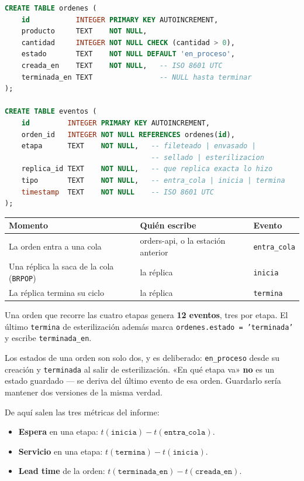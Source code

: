 \documentclass[12pt,a4paper]{article}
\begin{document}
\begin{lstlisting}[language=SQL]
CREATE TABLE ordenes (
    id           INTEGER PRIMARY KEY AUTOINCREMENT,
    producto     TEXT    NOT NULL,
    cantidad     INTEGER NOT NULL CHECK (cantidad > 0),
    estado       TEXT    NOT NULL DEFAULT 'en_proceso',
    creada_en    TEXT    NOT NULL,   -- ISO 8601 UTC
    terminada_en TEXT                -- NULL hasta terminar
);

CREATE TABLE eventos (
    id         INTEGER PRIMARY KEY AUTOINCREMENT,
    orden_id   INTEGER NOT NULL REFERENCES ordenes(id),
    etapa      TEXT    NOT NULL,   -- fileteado | envasado |
                                   -- sellado | esterilizacion
    replica_id TEXT    NOT NULL,   -- que replica exacta lo hizo
    tipo       TEXT    NOT NULL,   -- entra_cola | inicia | termina
    timestamp  TEXT    NOT NULL    -- ISO 8601 UTC
);
\end{lstlisting}

\begin{table}[H]
\centering
\footnotesize
\begin{tabular}{@{}p{4.4cm}p{5.4cm}l@{}}
\toprule
\textbf{Momento} & \textbf{Quién escribe} & \textbf{Evento} \\
\midrule
La orden entra a una cola & orders-api, o la estación anterior & \texttt{entra\_cola} \\
Una réplica la saca de la cola (\texttt{BRPOP}) & la réplica & \texttt{inicia} \\
La réplica termina su ciclo & la réplica & \texttt{termina} \\
\bottomrule
\end{tabular}
\end{table}

Una orden que recorre las cuatro etapas genera \textbf{12 eventos}, tres por
etapa. El último \texttt{termina} de esterilización además marca
\texttt{ordenes.estado = 'terminada'} y escribe \texttt{terminada\_en}.

Los estados de una orden son solo dos, y es deliberado: \texttt{en\_proceso}
desde su creación y \texttt{terminada} al salir de esterilización. «En qué etapa
va» \textbf{no} es un estado guardado — se deriva del último evento de esa orden.
Guardarlo sería mantener dos versiones de la misma verdad.

De aquí salen las tres métricas del informe:

\begin{itemize}[leftmargin=*, itemsep=1pt]
  \item \textbf{Espera} en una etapa: $t(\texttt{inicia}) - t(\texttt{entra\_cola})$.
  \item \textbf{Servicio} en una etapa: $t(\texttt{termina}) - t(\texttt{inicia})$.
  \item \textbf{Lead time} de la orden: $t(\texttt{terminada\_en}) - t(\texttt{creada\_en})$.
\end{itemize}
\end{document}
